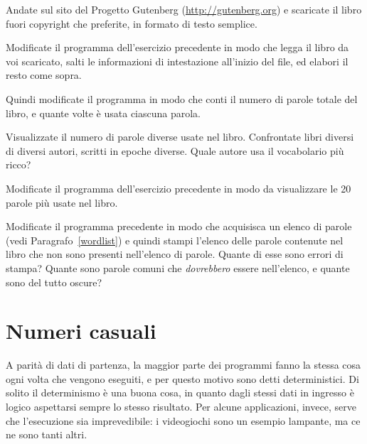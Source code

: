 \documentclass[10pt]{book}
\begin{document}
\vspace{0.2in}
\begin{exercise}

Andate sul sito del Progetto Gutenberg (\url{http://gutenberg.org}) e scaricate il libro fuori copyright che preferite, in formato di testo semplice.

Modificate il programma dell'esercizio precedente in modo che legga il libro da voi scaricato, salti le informazioni di intestazione all'inizio del file, ed elabori il resto come sopra.

Quindi modificate il programma in modo che conti il numero di parole totale del libro, e quante volte è usata ciascuna parola.

Visualizzate il numero di parole diverse usate nel libro. Confrontate libri diversi di diversi autori, scritti in epoche diverse. Quale autore usa il vocabolario più ricco?
\end{exercise}

\vspace{0.2in}
\begin{exercise}

Modificate il programma dell'esercizio precedente in modo da visualizzare le 20 parole più usate nel libro.

\end{exercise}

\vspace{0.2in}
\begin{exercise}

Modificate il programma precedente in modo che acquisisca un elenco di parole (vedi Paragrafo~\ref{wordlist}) e quindi stampi l'elenco delle parole contenute nel libro che non sono presenti nell'elenco di parole. Quante di esse sono errori di stampa? Quante sono parole comuni che {\em dovrebbero} essere nell'elenco, e quante sono del tutto oscure?

\end{exercise}


\section{Numeri casuali}

A parità di dati di partenza, la maggior parte dei programmi fanno la stessa cosa ogni volta che vengono eseguiti, e per questo motivo sono detti  deterministici. Di solito il determinismo è una buona cosa, in quanto dagli stessi dati in ingresso è logico aspettarsi sempre lo stesso risultato. Per alcune applicazioni, invece, serve che l'esecuzione sia imprevedibile: i videogiochi sono un esempio lampante, ma ce ne sono tanti altri.
\end{document}
